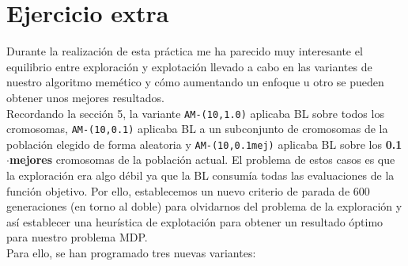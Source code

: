 \section{Ejercicio extra}

Durante la realización de esta práctica me ha parecido muy interesante el equilibrio entre exploración y explotación llevado a cabo en las variantes de nuestro algoritmo memético y cómo aumentando un enfoque u otro se pueden obtener unos mejores resultados. \\



Recordando la sección 5, la variante \texttt{AM-(10,1.0)} aplicaba BL sobre todos los cromosomas, \texttt{AM-(10,0.1)} aplicaba BL a un subconjunto de cromosomas de la población elegido de forma aleatoria y \texttt{AM-(10,0.1mej)} aplicaba BL sobre los \textbf{0.1$\cdot$mejores} cromosomas de la población actual. El problema de estos casos es que la exploración era algo débil ya que la BL consumía todas las evaluaciones de la función objetivo. Por ello, establecemos un nuevo criterio de parada de 600 generaciones (en torno al doble) para olvidarnos del problema de la exploración y  así establecer una heurística de explotación para obtener un resultado óptimo para nuestro problema MDP. \\

Para ello, se han programado tres nuevas variantes:



